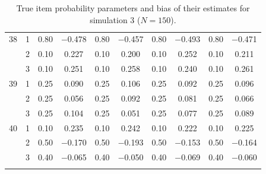 \begin{longtable}{llcccccccc}
  38 & 1 & 0.80 & $-$0.478 & 0.80 & $-$0.457 & 0.80 & $-$0.493 & 0.80 & $-$0.471 \\ 
   & 2 & 0.10 & 0.227 & 0.10 & 0.200 & 0.10 & 0.252 & 0.10 & 0.211 \\ 
   & 3 & 0.10 & 0.251 & 0.10 & 0.258 & 0.10 & 0.240 & 0.10 & 0.261 \\ 
  39 & 1 & 0.25 & 0.090 & 0.25 & 0.106 & 0.25 & 0.092 & 0.25 & 0.096 \\ 
   & 2 & 0.25 & 0.056 & 0.25 & 0.092 & 0.25 & 0.081 & 0.25 & 0.066 \\ 
   & 3 & 0.25 & 0.104 & 0.25 & 0.051 & 0.25 & 0.077 & 0.25 & 0.089 \\ 
  40 & 1 & 0.10 & 0.235 & 0.10 & 0.242 & 0.10 & 0.222 & 0.10 & 0.225 \\ 
   & 2 & 0.50 & $-$0.170 & 0.50 & $-$0.193 & 0.50 & $-$0.153 & 0.50 & $-$0.164 \\ 
   & 3 & 0.40 & $-$0.065 & 0.40 & $-$0.050 & 0.40 & $-$0.069 & 0.40 & $-$0.060 \\ 
   \bottomrule
\caption{True item probability parameters and bias of their estimates for simulation 3 ($N = 150$).} 
\label{table:sim3_item_prob_bias_N150}
\end{longtable}
